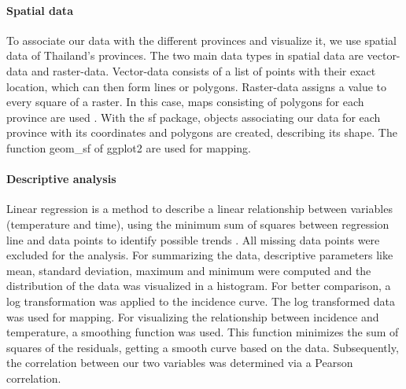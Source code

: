 	\paragraph{Spatial data}
	To associate our data with the different provinces and visualize it, we use spatial data of Thailand’s provinces. The two main data types in spatial data are vector-data and raster-data. Vector-data consists of a list of points with their exact location, which can then form lines or polygons. Raster-data assigns a value to every square of a raster. In this case, maps consisting of polygons for each province are used \citep{sds}. With the sf package, objects associating our data for each province with its coordinates and polygons are created, describing its shape. The function geom\_sf of ggplot2 are used for mapping. 
	


	
	\paragraph{Descriptive analysis}
	Linear regression is a method to describe a linear relationship between variables (temperature and time), using the minimum sum of squares between regression line and data points to identify possible trends \citep{Schneider2010}. 
	All missing data points were excluded for the analysis. For summarizing the data, descriptive parameters like mean, standard deviation, maximum and minimum were computed and the distribution of the data was visualized in a histogram. For better comparison, a log transformation was applied to the incidence curve. The log transformed data was used for mapping. 
	For visualizing the relationship between incidence and temperature, a smoothing function was used. This function minimizes the sum of squares of the residuals, getting a smooth curve based on the data. Subsequently, the correlation between our two variables was determined via a Pearson correlation.
